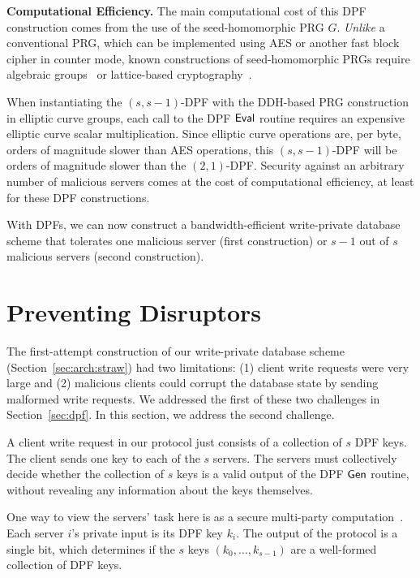 \documentclass[10pt,twocolumn]{article}
\newcommand{\nicepara}[1]{\medskip\noindent\textbf{#1.}}
\begin{document}
\nicepara{Computational Efficiency}
The main computational cost of this DPF construction
comes from the use of the seed-homomorphic PRG $G$.
\textit{Unlike} a conventional PRG, which can be implemented
using AES or another fast block cipher in counter mode,
known constructions of seed-homomorphic PRGs require
algebraic groups~\cite{naor1999distributed} 
or lattice-based cryptography~\cite{banerjee2014new,boneh2013key}.

When instantiating the $(s,s-1)$-DPF with 
the DDH-based PRG construction in elliptic curve groups,
each call to the DPF ${\sf Eval}$ routine 
requires an expensive 
elliptic curve scalar multiplication.
Since elliptic curve operations are, per byte,
orders of magnitude slower than AES operations,
this $(s,s-1)$-DPF will be orders
of magnitude slower than the $(2,1)$-DPF.
Security against an arbitrary number of malicious servers
comes at the cost of computational efficiency, at least
for these DPF constructions.

\medskip

With DPFs, we can now construct
a bandwidth-efficient write-private database scheme
that tolerates one malicious server (first construction)
or $s-1$ out of $s$ malicious servers (second construction).


 \section{Preventing Disruptors}
\label{sec:disrupt}

The first-attempt construction of
our write-private database scheme (Section~\ref{sec:arch:straw})
had two limitations: 
(1) client write requests were very large 
and (2) malicious clients could corrupt the database state
by sending malformed write requests.
We addressed the first of these two challenges
in Section~\ref{sec:dpf}.
In this section, we address the second challenge.

A client write request in our protocol just consists
of a collection of $s$ DPF keys.
The client sends one key to each of the $s$ servers.
The servers must collectively decide whether the collection
of $s$ keys is a valid output of the DPF ${\sf Gen}$ routine,
without revealing any information about the keys themselves.

One way to view the servers' task here is as a secure
multi-party computation~\cite{goldreich1987play,yao1982protocols}.
Each server $i$'s private input is its DPF key $k_i$.
The output of the protocol is a single bit, which determines if the $s$ keys $(k_0, \dots, k_{s-1})$ are a
well-formed collection of DPF keys.
\end{document}
